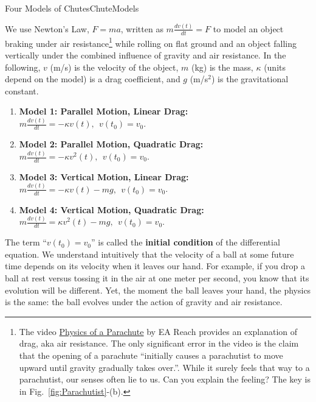 \bigskip

\begin{factColor}{Four Models of Chutes}{ChuteModels}

We use Newton's Law, $F = m a$, written as $m \frac{dv(t)}{dt} = F$ to model an object braking under air resistance\footnote{The video \href{https://youtu.be/ym1hqL4UX3I}{Physics of a Parachute} by EA Reach provides an explanation of drag, aka air resistance. The only significant error in the video is the claim that the opening of a parachute ``initially causes a parachutist to move upward until gravity gradually takes over.''. While it surely feels that way to a parachutist, our senses often lie to us. Can you explain the feeling? The key is in Fig.~\ref{fig:Parachutist}-(b).} while rolling on flat ground and an object falling vertically under the combined influence of gravity and air resistance. In the following, $v$ (m/s) is the velocity of the object, $m$ (kg) is the mass, $\kappa$ (units depend on the model) is a drag coefficient, and $g$ (m/s$^2$) is the gravitational constant. 

 \begin{enumerate}
\renewcommand{\labelenumi}{(\alph{enumi})}
\setlength{\itemsep}{.2cm}
    \item \textbf{Model 1: Parallel Motion, Linear Drag:} $m \frac{dv(t)}{dt} =  - \kappa v(t), ~~v(t_0) = v_0$.

    \item \textbf{Model 2: Parallel Motion, Quadratic Drag:} $m \frac{dv(t)}{dt} =  - \kappa v^2(t), ~~v(t_0) = v_0$.

    \item \textbf{Model 3: Vertical Motion, Linear Drag:} $m \frac{dv(t)}{dt} = - \kappa v(t)- mg, ~~v(t_0) = v_0$.

    \item \textbf{Model 4: Vertical Motion, Quadratic Drag:} $m \frac{dv(t)}{dt} = \kappa v^2(t)-mg, ~~v(t_0) = v_0$.
\end{enumerate}
The term ``$v(t_0) = v_0$'' is called the \textbf{initial condition} of the differential equation. We understand intuitively that the velocity of a ball at some future time depends on its velocity when it leaves our hand. For example, if you drop a ball at rest versus tossing it in the air at one meter per second, you know that its evolution will be different. Yet, the moment the ball leaves your hand, the physics is the same: the ball evolves under the action of gravity and air resistance.\\


\end{factColor}
